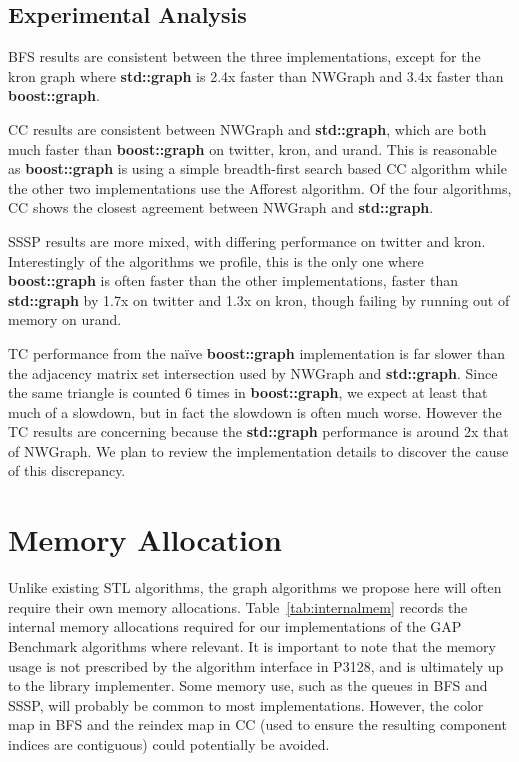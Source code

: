 \subsection{Experimental Analysis}
BFS results are consistent between the three implementations,
except for the kron graph where \textbf{std::graph} is 2.4x faster
than NWGraph and 3.4x faster than \textbf{boost::graph}.

CC results are consistent between NWGraph and \textbf{std::graph}, which
are both much faster than \textbf{boost::graph} on twitter, kron, and urand.
This is reasonable as \textbf{boost::graph} is using a simple breadth-first
search based CC algorithm while the other two implementations use the
Afforest algorithm.
Of the four algorithms, CC shows the closest agreement between NWGraph
and \textbf{std::graph}.

SSSP results are more mixed, with differing performance on twitter and kron.
Interestingly of the algorithms we profile, this is the only one where
\textbf{boost::graph} is often faster than the other implementations,
faster than \textbf{std::graph} by 1.7x on twitter and 1.3x on kron, though
failing by running out of memory on urand.

TC performance from the na\"ive \textbf{boost::graph} implementation
is far slower than the adjacency matrix set intersection used by NWGraph
and \textbf{std::graph}.
Since the same triangle is counted 6 times in \textbf{boost::graph},
we expect at least that much of a slowdown, but in fact the slowdown
is often much worse.
However the TC results are concerning because the \textbf{std::graph}
performance is around 2x that of NWGraph.
We plan to review the implementation details to discover the cause of
this discrepancy.

\section{Memory Allocation}
Unlike existing STL algorithms, the graph algorithms we propose here
will often require their own memory allocations.
Table~\ref{tab:internalmem} records the internal memory allocations
required for our implementations of the GAP Benchmark algorithms
where relevant.
It is important to note that the memory usage is not prescribed
by the algorithm interface in P3128, and is ultimately up to the
library implementer.
Some memory use, such as the queues in BFS and SSSP, will
probably be common to most implementations.
However, the color map in BFS and the reindex map in CC
(used to ensure the resulting component indices are contiguous)
could potentially be avoided.

